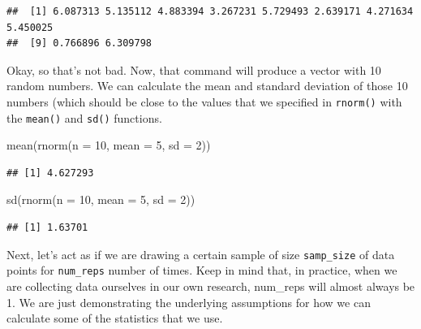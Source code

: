\documentclass[
]{book}
\newenvironment{Shaded}{\begin{snugshade}}{\end{snugshade}}
\newcommand{\AttributeTok}[1]{\textcolor[rgb]{0.77,0.63,0.00}{#1}}
\newcommand{\DecValTok}[1]{\textcolor[rgb]{0.00,0.00,0.81}{#1}}
\newcommand{\FunctionTok}[1]{\textcolor[rgb]{0.00,0.00,0.00}{#1}}
\newcommand{\NormalTok}[1]{#1}
\begin{document}
\begin{verbatim}
##  [1] 6.087313 5.135112 4.883394 3.267231 5.729493 2.639171 4.271634 5.450025
##  [9] 0.766896 6.309798
\end{verbatim}

Okay, so that's not bad. Now, that command will produce a vector with 10 random numbers. We can calculate the mean and standard deviation of those 10 numbers (which should be close to the values that we specified in \texttt{rnorm()} with the \texttt{mean()} and \texttt{sd()} functions.

\begin{Shaded}
\begin{Highlighting}[]
\FunctionTok{mean}\NormalTok{(}\FunctionTok{rnorm}\NormalTok{(}\AttributeTok{n =} \DecValTok{10}\NormalTok{, }\AttributeTok{mean =} \DecValTok{5}\NormalTok{, }\AttributeTok{sd =} \DecValTok{2}\NormalTok{))}
\end{Highlighting}
\end{Shaded}

\begin{verbatim}
## [1] 4.627293
\end{verbatim}

\begin{Shaded}
\begin{Highlighting}[]
\FunctionTok{sd}\NormalTok{(}\FunctionTok{rnorm}\NormalTok{(}\AttributeTok{n =} \DecValTok{10}\NormalTok{, }\AttributeTok{mean =} \DecValTok{5}\NormalTok{, }\AttributeTok{sd =} \DecValTok{2}\NormalTok{))}
\end{Highlighting}
\end{Shaded}

\begin{verbatim}
## [1] 1.63701
\end{verbatim}

Next, let's act as if we are drawing a certain sample of size \texttt{samp\_size} of data points for \texttt{num\_reps} number of times. Keep in mind that, in practice, when we are collecting data ourselves in our own research, num\_reps will almost always be 1. We are just demonstrating the underlying assumptions for how we can calculate some of the statistics that we use.
\end{document}

